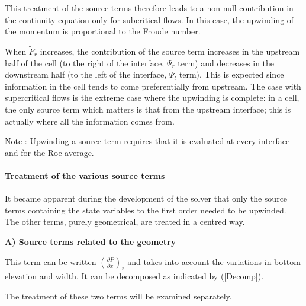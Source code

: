 \vspace{0.5cm}

This treatment of the source terms therefore leads to a non-null contribution in the continuity equation only for subcritical flows. In this case, the upwinding of the momentum is proportional to the Froude number.

\vspace{0.5cm}

When $\tilde{F}_r$ increases, the contribution of the source term increases in the upstream half of the cell (to the right of the interface, $\Psi_r$ term) and decreases in the downstream half (to the left of the interface, $\Psi_l$ term). This is expected since information in the cell tends to come preferentially from upstream. The case with supercritical flows is the extreme case where the upwinding is complete: in a cell, the only source term which matters is that from the upstream interface; this is actually where all the information comes from.

\vspace{0.5cm}
\underline{Note} : Upwinding a source term requires that it is evaluated at every interface and for the Roe average.

\paragraph{Treatment of the various source terms\\}

\hspace*{1cm}

It became apparent during the development of the solver that only the source terms containing the state variables to the first order needed to be upwinded. The other terms, purely geometrical, are treated in a centred way.

\vspace{0.5cm}

\textbf{A) \underline{Source terms related to the geometry}}

\vspace{0.5cm}

This term can be written  $\left ( \frac{\partial P}{\partial x}\right )_z$ and takes into account the variations in bottom elevation and width. It can be decomposed as indicated by (\ref{Decomp}).

\vspace{0.5cm}

The treatment of these two terms will be examined separately.

